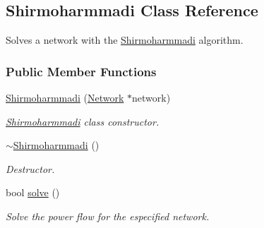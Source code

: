 \hypertarget{class_shirmoharmmadi}{}\subsection{Shirmoharmmadi Class Reference}
\label{class_shirmoharmmadi}


Solves a network with the \hyperlink{class_shirmoharmmadi}{Shirmoharmmadi} algorithm.  


\subsubsection*{Public Member Functions}
\begin{DoxyCompactItemize}
\item 
\hyperlink{group___algorithms_gaa5833386f9b43019a318c81a3006e2b1}{Shirmoharmmadi} (\hyperlink{class_network}{Network} $\ast$network)
\begin{DoxyCompactList}\small\item\em \hyperlink{class_shirmoharmmadi}{Shirmoharmmadi} class constructor. \end{DoxyCompactList}\item 
\hyperlink{group___algorithms_gac89016d70d3c99339af11f3b6f1f23b2}{$\sim$\+Shirmoharmmadi} ()
\begin{DoxyCompactList}\small\item\em Destructor. \end{DoxyCompactList}\item 
bool \hyperlink{group___algorithms_gacb4a06c62b5d97c25bea70acd477e715}{solve} ()
\begin{DoxyCompactList}\small\item\em Solve the power flow for the especified network. \end{DoxyCompactList}\end{DoxyCompactItemize}
